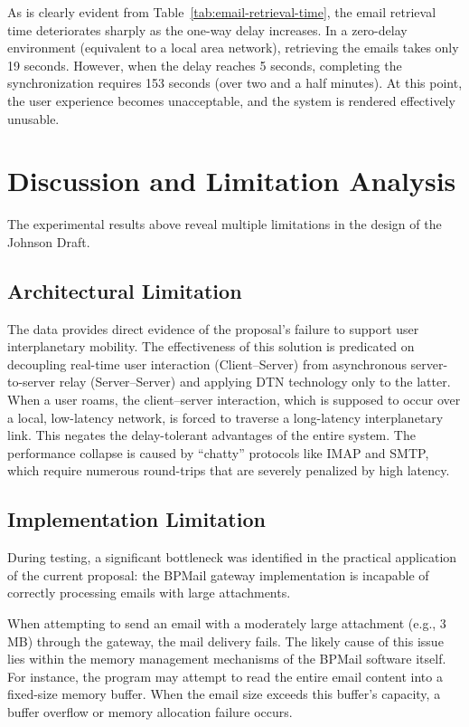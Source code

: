 As is clearly evident from Table~\ref{tab:email-retrieval-time}, the email retrieval time deteriorates sharply as the one-way delay increases.  
In a zero-delay environment (equivalent to a local area network), retrieving the emails takes only 19 seconds.  
However, when the delay reaches 5 seconds, completing the synchronization requires 153 seconds (over two and a half minutes).  
At this point, the user experience becomes unacceptable, and the system is rendered effectively unusable.

\section{Discussion and Limitation Analysis}

The experimental results above reveal multiple limitations in the design of the Johnson Draft.

\subsection{Architectural Limitation}

The data provides direct evidence of the proposal's failure to support user interplanetary mobility.  
The effectiveness of this solution is predicated on decoupling real-time user interaction (Client--Server) from asynchronous server-to-server relay (Server--Server) and applying DTN technology only to the latter.  
When a user roams, the client--server interaction, which is supposed to occur over a local, low-latency network, is forced to traverse a long-latency interplanetary link.  
This negates the delay-tolerant advantages of the entire system.  
The performance collapse is caused by ``chatty'' protocols like IMAP and SMTP, which require numerous round-trips that are severely penalized by high latency.

\subsection{Implementation Limitation}

During testing, a significant bottleneck was identified in the practical application of the current proposal: the BPMail gateway implementation is incapable of correctly processing emails with large attachments.

When attempting to send an email with a moderately large attachment (e.g., 3\,MB) through the gateway, the mail delivery fails.  
The likely cause of this issue lies within the memory management mechanisms of the BPMail software itself.  
For instance, the program may attempt to read the entire email content into a fixed-size memory buffer.  
When the email size exceeds this buffer's capacity, a buffer overflow or memory allocation failure occurs.

